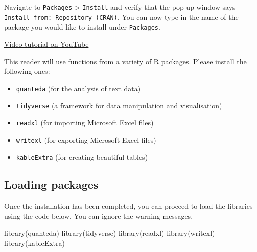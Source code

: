 \documentclass[
  11pt,
  letterpaper,
  DIV=11,
  numbers=noendperiod]{scrreprt}
\newenvironment{Shaded}{\begin{snugshade}}{\end{snugshade}}
\newcommand{\FunctionTok}[1]{\textcolor[rgb]{0.28,0.35,0.67}{#1}}
\newcommand{\NormalTok}[1]{\textcolor[rgb]{0.00,0.23,0.31}{#1}}
\begin{document}
\begin{tcolorbox}[enhanced jigsaw, toprule=.15mm, opacitybacktitle=0.6, coltitle=black, arc=.35mm, colback=white, title=\textcolor{quarto-callout-note-color}{\faInfo}\hspace{0.5em}{How do I install a library?}, titlerule=0mm, toptitle=1mm, bottomtitle=1mm, breakable, rightrule=.15mm, opacityback=0, bottomrule=.15mm, leftrule=.75mm, colframe=quarto-callout-note-color-frame, left=2mm, colbacktitle=quarto-callout-note-color!10!white]

Navigate to \texttt{Packages} \textgreater{} \texttt{Install} and verify
that the pop-up window says \texttt{Install\ from:\ Repository\ (CRAN)}.
You can now type in the name of the package you would like to install
under \texttt{Packages}.

\href{https://www.youtube.com/watch?v=u1r5XTqrCTQ}{Video tutorial on
YouTube}

\end{tcolorbox}

This reader will use functions from a variety of R packages. Please
install the following ones:

\begin{itemize}
\item
  \texttt{quanteda} (for the analysis of text data)
\item
  \texttt{tidyverse} (a framework for data manipulation and
  visualisation)
\item
  \texttt{readxl} (for importing Microsoft Excel files)
\item
  \texttt{writexl} (for exporting Microsoft Excel files)
\item
  \texttt{kableExtra} (for creating beautiful tables)
\end{itemize}

\subsection{Loading packages}\label{loading-packages}

Once the installation has been completed, you can proceed to load the
libraries using the code below. You can ignore the warning messages.

\begin{Shaded}
\begin{Highlighting}[]
\FunctionTok{library}\NormalTok{(quanteda)}
\FunctionTok{library}\NormalTok{(tidyverse)}
\FunctionTok{library}\NormalTok{(readxl)}
\FunctionTok{library}\NormalTok{(writexl)}
\FunctionTok{library}\NormalTok{(kableExtra)}
\end{Highlighting}
\end{Shaded}
\end{document}
